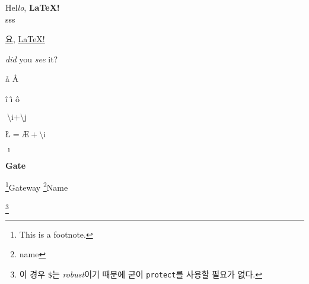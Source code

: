 \documentclass{article}
\begin{document}
Hel\emph{lo}, \textbf{\LaTeX!}\\
sss

\underline{요}, \underline{\LaTeX!}

\emph{did} you \emph{see} it?

\aa
\AA

\^{i}
\^\i
\^{o}

$\mbox{\^\i} + \mbox{\^\j}$

$\mbox{\L} = \mbox{\AE} + \mbox{\^\i}$

$\imath$

\footnotemark\textbf{Gate} \addtocounter{footnote}{-1}\footnote{This is a footnote.}Gateway \footnote{name}Name

\footnote{이 경우 \texttt{\$}는 \emph{robust}이기 때문에 굳이 \texttt{protect}를 사용할 필요가 없다.}
\end{document}
